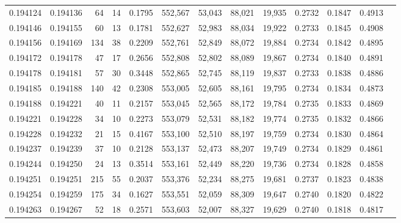 \begin{tabular}{rrrrrrrrrrrrr}
0.194124 & 0.194136 &    64 &  14 &                                     0.1795 & 552,567 &  53,043 &  88,021 &  19,935 & 0.2732 & 0.1847 & 0.4913 \\
0.194146 & 0.194155 &    60 &  13 &                                     0.1781 & 552,627 &  52,983 &  88,034 &  19,922 & 0.2733 & 0.1845 & 0.4908 \\
0.194156 & 0.194169 &   134 &  38 &                                     0.2209 & 552,761 &  52,849 &  88,072 &  19,884 & 0.2734 & 0.1842 & 0.4895 \\
0.194172 & 0.194178 &    47 &  17 &                                     0.2656 & 552,808 &  52,802 &  88,089 &  19,867 & 0.2734 & 0.1840 & 0.4891 \\
0.194178 & 0.194181 &    57 &  30 &                                     0.3448 & 552,865 &  52,745 &  88,119 &  19,837 & 0.2733 & 0.1838 & 0.4886 \\
0.194185 & 0.194188 &   140 &  42 &                                     0.2308 & 553,005 &  52,605 &  88,161 &  19,795 & 0.2734 & 0.1834 & 0.4873 \\
0.194188 & 0.194221 &    40 &  11 &                                     0.2157 & 553,045 &  52,565 &  88,172 &  19,784 & 0.2735 & 0.1833 & 0.4869 \\
0.194221 & 0.194228 &    34 &  10 &                                     0.2273 & 553,079 &  52,531 &  88,182 &  19,774 & 0.2735 & 0.1832 & 0.4866 \\
0.194228 & 0.194232 &    21 &  15 &                                     0.4167 & 553,100 &  52,510 &  88,197 &  19,759 & 0.2734 & 0.1830 & 0.4864 \\
0.194237 & 0.194239 &    37 &  10 &                                     0.2128 & 553,137 &  52,473 &  88,207 &  19,749 & 0.2734 & 0.1829 & 0.4861 \\
0.194244 & 0.194250 &    24 &  13 &                                     0.3514 & 553,161 &  52,449 &  88,220 &  19,736 & 0.2734 & 0.1828 & 0.4858 \\
0.194251 & 0.194251 &   215 &  55 &                                     0.2037 & 553,376 &  52,234 &  88,275 &  19,681 & 0.2737 & 0.1823 & 0.4838 \\
0.194254 & 0.194259 &   175 &  34 &                                     0.1627 & 553,551 &  52,059 &  88,309 &  19,647 & 0.2740 & 0.1820 & 0.4822 \\
0.194263 & 0.194267 &    52 &  18 &                                     0.2571 & 553,603 &  52,007 &  88,327 &  19,629 & 0.2740 & 0.1818 & 0.4817 \\

\end{tabular}
